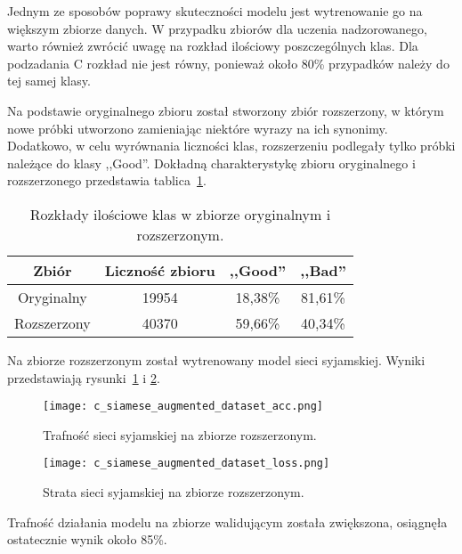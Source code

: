 Jednym ze sposobów poprawy skuteczności modelu jest wytrenowanie go na większym zbiorze danych. W przypadku zbiorów dla uczenia nadzorowanego, warto również zwrócić uwagę na rozkład ilościowy poszczególnych klas. Dla podzadania C rozkład nie jest równy, ponieważ około 80\% przypadków należy do tej samej klasy.

Na podstawie oryginalnego zbioru został stworzony zbiór rozszerzony, w którym nowe próbki utworzono zamieniając niektóre wyrazy na ich synonimy. Dodatkowo, w celu wyrównania liczności klas, rozszerzeniu podlegały tylko próbki należące do klasy ,,Good''. Dokładną charakterystykę zbioru oryginalnego i rozszerzonego przedstawia tablica~\ref{c_augmented_set_percentage}.

\begin{table}[H]
\caption{Rozkłady ilościowe klas w zbiorze oryginalnym i rozszerzonym.}
\label{c_augmented_set_percentage}
    \begin{center}
        \begin{tabular}{ |c|c|c|c| } 
            \hline
            Zbiór & Liczność zbioru & ,,Good'' & ,,Bad''\\
            \hline
            Oryginalny & 19954 & 18,38\% & 81,61\%\\
            \hline
            Rozszerzony & 40370 & 59,66\% & 40,34\%\\ 
            \hline
        \end{tabular}
    \end{center}
\end{table}

Na zbiorze rozszerzonym został wytrenowany model sieci syjamskiej. Wyniki przedstawiają rysunki~\ref{c_siamese_augmented_acc} i \ref{c_siamese_augmented_loss}.

\begin{figure}[H]
\centering
\texttt{[image: c\_siamese\_augmented\_dataset\_acc.png]}
\caption{Trafność sieci syjamskiej na zbiorze rozszerzonym.}
\label{c_siamese_augmented_acc}
\end{figure}

\begin{figure}[H]
\centering
\texttt{[image: c\_siamese\_augmented\_dataset\_loss.png]}
\caption{Strata sieci syjamskiej na zbiorze rozszerzonym.}
\label{c_siamese_augmented_loss}
\end{figure}

Trafność działania modelu na zbiorze walidującym została zwiększona, osiągnęła ostatecznie wynik około 85\%.

